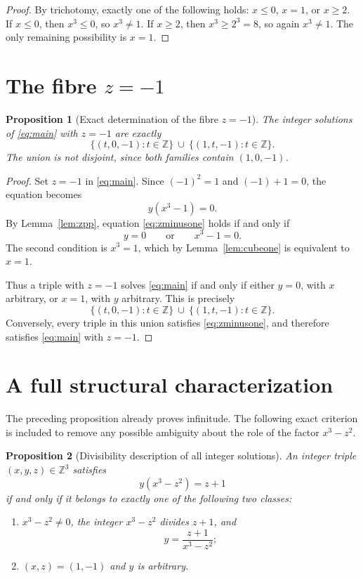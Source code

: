 \documentclass[11pt]{article}
\newtheorem{proposition}{Proposition}
\theoremstyle{remark}
\newcommand{\Z}{\mathbb{Z}}
\begin{document}
\begin{proof}
By trichotomy, exactly one of the following holds: $x\le 0$, $x=1$, or
$x\ge 2$.  If $x\le 0$, then $x^3\le 0$, so $x^3\ne 1$.  If $x\ge 2$, then
$x^3\ge 2^3=8$, so again $x^3\ne 1$.  The only remaining possibility is
$x=1$.
\end{proof}

\section{The fibre \texorpdfstring{$z=-1$}{z=-1}}

\begin{proposition}[Exact determination of the fibre $z=-1$]\label{prop:fibre}
The integer solutions of \eqref{eq:main} with $z=-1$ are exactly
\[
        \{(t,0,-1):t\in\Z\}\ \cup\ \{(1,t,-1):t\in\Z\}.
\]
The union is not disjoint, since both families contain $(1,0,-1)$.
\end{proposition}

\begin{proof}
Set $z=-1$ in \eqref{eq:main}.  Since $(-1)^2=1$ and $(-1)+1=0$, the equation
becomes
\begin{equation}\label{eq:zminusone}
        y(x^3-1)=0.
\end{equation}
By Lemma~\ref{lem:zpp}, equation \eqref{eq:zminusone} holds if and only if
\[
        y=0 \qquad \text{or} \qquad x^3-1=0.
\]
The second condition is $x^3=1$, which by Lemma~\ref{lem:cubeone} is equivalent
to $x=1$.

Thus a triple with $z=-1$ solves \eqref{eq:main} if and only if either
$y=0$, with $x$ arbitrary, or $x=1$, with $y$ arbitrary.  This is precisely
\[
        \{(t,0,-1):t\in\Z\}\ \cup\ \{(1,t,-1):t\in\Z\}.
\]
Conversely, every triple in this union satisfies \eqref{eq:zminusone}, and
therefore satisfies \eqref{eq:main} with $z=-1$.
\end{proof}

\section{A full structural characterization}

The preceding proposition already proves infinitude.  The following exact
criterion is included to remove any possible ambiguity about the role of the
factor $x^3-z^2$.

\begin{proposition}[Divisibility description of all integer solutions]\label{prop:structure}
An integer triple $(x,y,z)\in\Z^3$ satisfies
\[
        y(x^3-z^2)=z+1
\]
if and only if it belongs to exactly one of the following two classes:
\begin{enumerate}[label=\textup{(\roman*)}]
    \item $x^3-z^2\ne 0$, the integer $x^3-z^2$ divides $z+1$, and
    \[
            y=\frac{z+1}{x^3-z^2};
    \]
    \item $(x,z)=(1,-1)$ and $y$ is arbitrary.
\end{enumerate}
\end{proposition}
\end{document}
